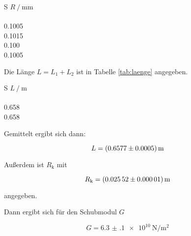 \begin{table}[h]
  \centering
  \caption{Messwerte des Radius des Drahts.}
  \label{tab:raddraht}
  \begin{tabular}{S}
    \toprule
    {$R\:/\:\si{\milli\meter}$} \\
     \\
    0.1005 \\
    0.1015 \\
    0.100 \\
    0.1005 \\
    \bottomrule
  \end{tabular}
\end{table}

Die Länge $L = L_1 + L_2$ ist in Tabelle \ref{tab:laenge} angegeben.

\begin{table}[h]
  \centering
  \caption{Messwerte der Länge des Drahts.}
  \label{tab:laenge}
  \begin{tabular}{S}
    \toprule
    {$L\:/\:\si{\meter}$} \\
     \\
    0.658 \\
    0.658 \\
    \bottomrule
  \end{tabular}
\end{table}

Gemittelt ergibt sich dann:

\begin{equation*}
  L = \SI{0.6577 +- 0.0005}{\meter}
\end{equation*}

Außerdem ist $R_{\text{k}}$ mit

\begin{equation*}
  R_{\text{k}} = \SI{0.02552 +- 0.00001}{\meter}
\end{equation*}

angegeben.

Dann ergibt sich für den Schubmodul $G$

\begin{equation*}
  G = \SI{6.3(1)e10}{\newton\per\meter\squared}
\end{equation*}
